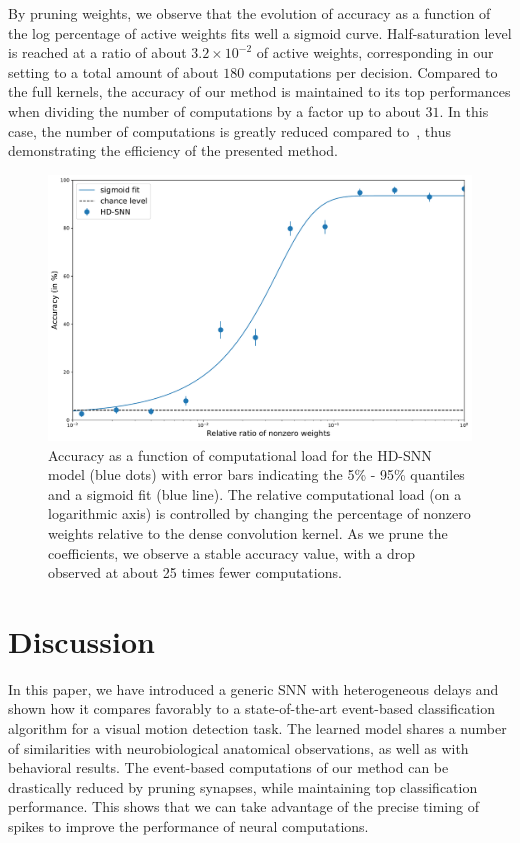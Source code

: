 \documentclass[default]{sn-jnl}%
\theoremstyle{thmstyleone}%
\theoremstyle{thmstyletwo}%
\theoremstyle{thmstylethree}%
\begin{document}
By pruning weights, we observe that the evolution of accuracy as a function of the log percentage of active weights fits well a sigmoid curve. Half-saturation level is reached at a ratio of about $3.2\times 10^{-2}$ of active weights, corresponding in our setting to a total amount of about $180$ computations per decision. Compared to the full kernels, the accuracy of our method is maintained to its top performances when dividing the number of computations by a factor up to about $31$. In this case, the number of computations is greatly reduced compared to~\citep{grimaldi_robust_2022}, thus demonstrating the efficiency of the presented method. 
%
\begin{figure}%
    \centering
    \includegraphics[width=0.95\linewidth]{figures/quant_accuracy.pdf}
    \caption{Accuracy as a function of computational load for the HD-SNN model (blue dots) with error bars indicating the 5\% - 95\% quantiles and a sigmoid fit (blue line). The relative computational load (on a logarithmic axis) is controlled by changing the percentage of nonzero weights relative to the dense convolution kernel. As we prune the coefficients, we observe a stable accuracy value, with a drop observed at about 25 times fewer computations.}
    \label{fig:accuracy}
\end{figure}
%
\section{Discussion}
In this paper, we have introduced a generic SNN with heterogeneous delays and shown how it compares favorably to a state-of-the-art event-based classification algorithm for a visual motion detection task. The learned model shares a number of similarities with neurobiological anatomical observations, as well as with behavioral results. The event-based computations of our method can be drastically reduced by pruning synapses, while maintaining top classification performance. This shows that we can take advantage of the precise timing of spikes to improve the performance of neural computations.
%
\end{document}
